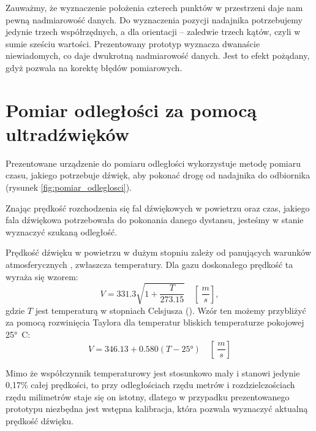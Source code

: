 Zauważmy, że wyznaczenie położenia czterech punktów w przestrzeni daje nam pewną nadmiarowość
danych. Do wyznaczenia pozycji nadajnika potrzebujemy jedynie trzech współrzędnych,
a dla orientacji -- zaledwie trzech kątów, czyli w sumie sześciu wartości.
Prezentowany prototyp wyznacza  dwanaście niewiadomych, co daje dwukrotną nadmiarowość danych.
Jest to efekt pożądany, gdyż pozwala na korektę błędów pomiarowych.


\section{Pomiar odległości za pomocą ultradźwięków}\label{sec:pomiar}

Prezentowane urządzenie do pomiaru odległości wykorzystuje metodę pomiaru czasu, jakiego
potrzebuje dźwięk, aby pokonać drogę od nadajnika do odbiornika
(rysunek \ref{fig:pomiar_odleglosci}).

Znając prędkość rozchodzenia się fal dźwiękowych w powietrzu oraz czas, jakiego fala dźwiękowa potrzebowała
do pokonania danego dystansu, jesteśmy w stanie wyznaczyć szukaną odległość.

Prędkość dźwięku w powietrzu w dużym stopniu zależy od panujących warunków atmosferycznych \cite{bib:soundSpeed},
zwłaszcza temperatury.
Dla gazu doskonałego prędkość ta wyraża się wzorem:
\[
V = \num{331,3}  \sqrt{1+\frac{T}{\num{273,15}}} \quad \left[ \SI{}{\frac{m}{s}} \right],
\]
gdzie $T$ jest temperaturą w stopniach Celsjusza (\SI{}{\degC}).
Wzór ten możemy przybliżyć za pomocą rozwinięcia Taylora dla temperatur bliskich temperaturze pokojowej \ang{25}\SI{}{C}:
\[
 V = \num{346,13}  +  \num{0,580}(T - \ang{25})  \quad \left[ \SI{}{ \frac{m}{s}} \right]
\]

Mimo że współczynnik temperaturowy jest stosunkowo mały i stanowi jedynie 0,17\% całej prędkości,
to przy odległościach rzędu metrów i rozdzielczościach rzędu milimetrów staje się on istotny, 
dlatego w przypadku prezentowanego prototypu niezbędna jest wstępna kalibracja, która pozwala
wyznaczyć aktualną prędkość dźwięku.





